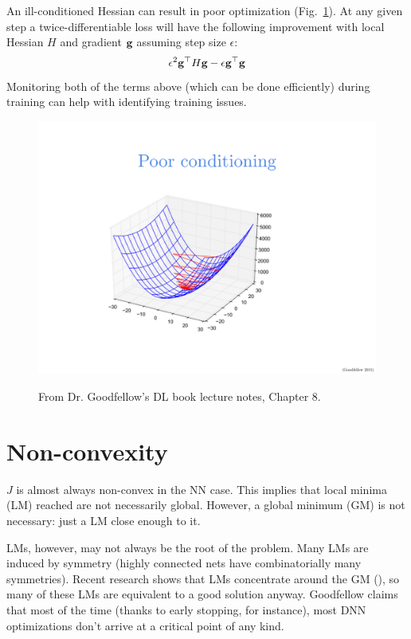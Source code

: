 \documentclass{article}
\begin{document}
An ill-conditioned Hessian can result in poor optimization (Fig.~\ref{fig:illcond}). At any given step a twice-differentiable loss will have the following improvement with local Hessian $H$ and gradient $\textbf{g}$ assuming step size $\epsilon$:
$$
\epsilon^2 \textbf{g}^\top H\textbf{g}-\epsilon \textbf{g}^\top\textbf{g}
$$
Monitoring both of the terms above (which can be done efficiently) during training can help with identifying training issues.

\begin{figure}[!h]
\centering
{\includegraphics[width=\textwidth]{ill-condition.pdf}}
\caption{From Dr. Goodfellow's DL book lecture notes, Chapter 8.}
\label{fig:illcond}
\end{figure}

\section{Non-convexity}

$J$ is almost always non-convex in the NN case. This implies that local minima (LM) reached are not necessarily global. However, a global minimum (GM) is not necessary: just a LM close enough to it.

LMs, however, may not always be the root of the problem. Many LMs are induced by symmetry (highly connected nets have combinatorially many symmetries). Recent research shows that LMs concentrate around the GM (), so many of these LMs are equivalent to a good solution anyway. Goodfellow claims that most of the time (thanks to early stopping, for instance), most DNN optimizations don't arrive at a critical point of any kind.
\end{document}
